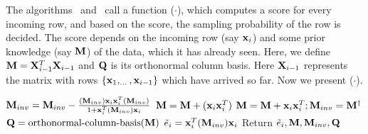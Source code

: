 The algorithms \online~and ~call a function \oscore($\cdot$), which computes a score for every incoming row, and based on the score, the sampling probability of the row is decided. The score depends on the incoming row (say $\mathbf{x}_{i}$) and some prior knowledge (say $\mathbf{M}$) of the data, which it has already seen. Here, we define $\mathbf{M} = \mathbf{X}_{i-1}^{T}\mathbf{X}_{i-1}$ and $\mathbf{Q}$ is its orthonormal column basis. Here $\mathbf{X}_{i-1}$ represents the matrix with rows $\{\mathbf{x}_{1},_{\ldots},\mathbf{x}_{i-1}\}$ which have arrived so far. Now we present \oscore($\cdot$).
% 
\begin{algorithm}[htpb]
\caption{\oscore($\*x_{i}, \*M, \*M_{inv}, \*Q$)}{\label{alg:onineScore}}
\begin{algorithmic}
\STATE $\mathbf{M}_{inv} = \mathbf{M}_{inv} - \frac{(\mathbf{M}_{inv})\mathbf{x}_{i}\mathbf{x}_{i}^{T}(\mathbf{M}_{inv})}{1+\mathbf{x}_{i}^{T}(\mathbf{M}_{inv})\mathbf{x}_{i}}$
\STATE $\mathbf{M} = \mathbf{M} + (\mathbf{x}_{i}\mathbf{x}_{i}^T)$
\ELSE
\STATE $\mathbf{M} = \mathbf{M} + \mathbf{x}_{i}\mathbf{x}_{i}^{T}; \mathbf{M}_{inv} = \mathbf{M}^{\dagger}$
\STATE $\mathbf{Q} = \mbox{orthonormal-column-basis}(\mathbf{M})$
\ENDIF
\STATE $\tilde{e}_{i} = \mathbf{x}_{i}^T(\mathbf{M}_{inv})\mathbf{x}_{i}$
\STATE Return $\tilde{e}_{i},\mathbf{M},\mathbf{M}_{inv},\mathbf{Q}$
\end{algorithmic}
\end{algorithm}

